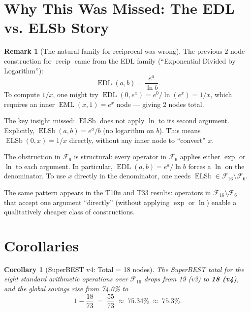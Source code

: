 \documentclass[12pt,a4paper]{article}
\newtheorem{corollary}[theorem]{Corollary}
\theoremstyle{definition}
\newtheorem{remark}[theorem]{Remark}
\newcommand{\EML}{\operatorname{EML}}
\newcommand{\EDL}{\operatorname{EDL}}
\newcommand{\ELSb}{\operatorname{ELSb}}
\newcommand{\recip}{\operatorname{recip}}
\begin{document}
\section{Why This Was Missed: The EDL vs. ELSb Story}

\begin{remark}[The natural family for reciprocal was wrong]
\label{rem:edl}
The previous 2-node construction for $\recip$ came from the EDL family
(``Exponential Divided by Logarithm''):
\[
  \EDL(a,b) = \frac{e^a}{\ln b}.
\]
To compute $1/x$, one might try $\EDL(0, e^x) = e^0 / \ln(e^x) = 1/x$,
which requires an inner $\EML(x,1) = e^x$ node --- giving 2 nodes total.

The key insight missed: $\ELSb$ does not apply $\ln$ to its second argument.
Explicitly, $\ELSb(a,b) = e^a / b$ (no logarithm on $b$).  This means
$\ELSb(0, x) = 1/x$ directly, without any inner node to ``convert'' $x$.

The obstruction in $\mathcal{F}_6$ is structural: every operator in
$\mathcal{F}_6$ applies either $\exp$ or $\ln$ to each argument.
In particular, $\EDL(a,b) = e^a/\ln b$ forces a $\ln$ on the denominator.
To use $x$ directly in the denominator, one needs $\ELSb \in \mathcal{F}_{16}
\setminus \mathcal{F}_6$.

The same pattern appears in the T10u and T33 results:
operators in $\mathcal{F}_{16}\setminus\mathcal{F}_6$ that accept one
argument ``directly'' (without applying $\exp$ or $\ln$) enable a
qualitatively cheaper class of constructions.
\end{remark}

\section{Corollaries}

\begin{corollary}[SuperBEST v4: Total = 18 nodes]
\label{cor:superbest4}
The SuperBEST total for the eight standard arithmetic operations over
$\mathcal{F}_{16}$ drops from 19 (v3) to \textbf{18 (v4)}, and the
global savings rise from 74.0\% to
\[
  1 - \frac{18}{73} \;=\; \frac{55}{73} \;\approx\; 75.34\% \;\approx\; \mathbf{75.3\%}.
\]
\end{corollary}
\end{document}

